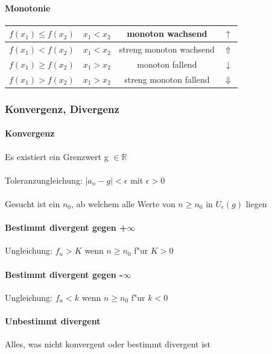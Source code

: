 			
			\paragraph{Monotonie}
			
			\begin{tabular}{|c|c|c|c|}
				\hline
				$f(x_1) \leq f(x_2)$ & $x_1 < x_2$ & monoton wachsend & $\uparrow$\\
				\hline
				$f(x_1) < f(x_2)$ & $x_1 < x_2$ & streng monoton wachsend & $\Uparrow$\\
				\hline
				$f(x_1) \geq f(x_2)$ & $x_1 > x_2$ & monoton fallend & $\downarrow$\\
				\hline
				$f(x_1) > f(x_2)$ & $x_1 > x_2$ & streng monoton fallend & $\Downarrow$\\
				\hline
			\end{tabular}
			
			
			\subsubsection{Konvergenz, Divergenz}
				\paragraph{Konvergenz}
			Es existiert ein Grenzwert g $\in \mathbb{R}$	\\
			\\
			Toleranzungleichung: $\vert a_n - g \vert < \epsilon$  mit $\epsilon > 0$ \\
			\\
			Gesucht ist ein $n_0$, ab welchem alle Werte von $n \geq n_0$ in $U_\epsilon(g)$ liegen 
			
			\paragraph{Bestimmt divergent gegen +$\infty$}				Ungleichung: $f_n > K$ wenn $n \geq  n_0$ f"ur $K > 0$ 
			
			\paragraph{Bestimmt divergent gegen -$\infty$}
			Ungleichung: $f_n < k$ wenn $n \geq  n_0$ f"ur $k < 0$ 
			
			\paragraph{Unbestimmt divergent}
			Alles, was nicht konvergent oder bestimmt divergent ist
			
